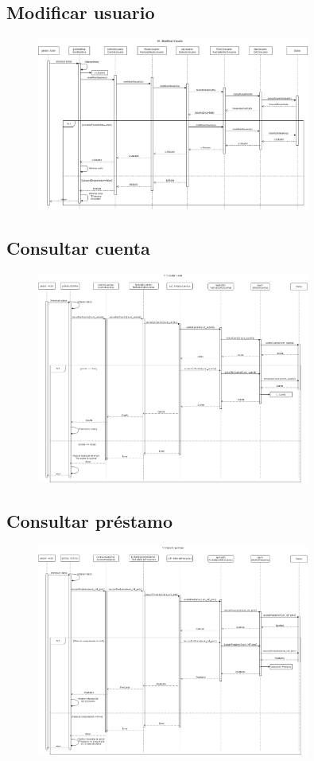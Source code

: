 \documentclass[12pt]{article}
\begin{document}
\subsection{Modificar usuario}
\begin{figure}[H]
    \centering
    \includegraphics[width=0.8\textwidth]{10._ModificarUsuario.png}
\end{figure}
\subsection{Consultar cuenta}
\begin{figure}[H]
    \centering
    \includegraphics[width=0.8\textwidth]{ConsultaCuenta.png}
\end{figure}
\subsection{Consultar préstamo}
\begin{figure}[H]
    \centering
    \includegraphics[width=0.8\textwidth]{consultar_prestamo.png}
\end{figure}
\end{document}
